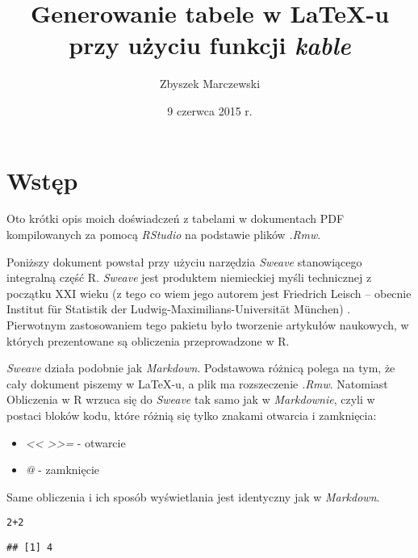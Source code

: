 \documentclass[a4paper, 10pt]{article}\usepackage[]{graphicx}\usepackage[]{color}
\makeatletter
\newcommand{\hlnum}[1]{\textcolor[rgb]{0.686,0.059,0.569}{#1}}%
\newcommand{\hlopt}[1]{\textcolor[rgb]{0,0,0}{#1}}%
\newenvironment{kframe}{%
 \def\at@end@of@kframe{}%
 \ifinner\ifhmode%
  \def\at@end@of@kframe{\end{minipage}}%
  \begin{minipage}{\columnwidth}%
 \fi\fi%
 \def\FrameCommand##1{\hskip\@totalleftmargin \hskip-\fboxsep
 \colorbox{shadecolor}{##1}\hskip-\fboxsep
     \hskip-\linewidth \hskip-\@totalleftmargin \hskip\columnwidth}%
 \MakeFramed {\advance\hsize-\width
   \@totalleftmargin\z@ \linewidth\hsize
   \@setminipage}}%
 {\par\unskip\endMakeFramed%
 \at@end@of@kframe}
\newenvironment{knitrout}{}{} %
\makeatother
\begin{document}
\title{Generowanie tabele w LaTeX-u przy użyciu funkcji \emph{kable}}
\date{9 czerwca 2015 r.}
\author{ Zbyszek Marczewski}

\maketitle

\tableofcontents

\section{Wstęp}

Oto krótki opis moich doświadczeń z tabelami w dokumentach PDF kompilowanych za pomocą \emph{RStudio} na podstawie plików \emph{.Rmw}.
\vspace{5mm}

Poniższy dokument powstał przy użyciu narzędzia \emph{Sweave} stanowiącego integralną część R. \emph{Sweave} jest produktem niemieckiej myśli technicznej z początku XXI wieku (z tego co wiem jego autorem jest Friedrich Leisch – obecnie Institut für Statistik der Ludwig-Maximilians-Universität München) . Pierwotnym zastosowaniem tego pakietu było tworzenie artykułów naukowych, w których prezentowane są obliczenia przeprowadzone w R. 
\vspace{5mm}

\emph{Sweave} działa podobnie jak \emph{Markdown}. Podstawowa różnicą polega na tym, że cały dokument  piszemy w LaTeX-u, a plik ma rozszeczenie \emph{.Rmw}. Natomiast Obliczenia w R wrzuca się do \emph{Sweave} tak samo jak w \emph{Markdownie}, czyli w postaci bloków kodu, które różnią się tylko znakami otwarcia i zamknięcia:

\begin{itemize}
  \item \emph{<< >>=} - otwarcie
  \item \emph{@} - zamknięcie
\end{itemize}

Same obliczenia i ich sposób wyświetlania jest identyczny jak w \emph{Markdown}.

\begin{knitrout}
\color{fgcolor}\begin{kframe}
\begin{alltt}
\hlnum{2}\hlopt{+}\hlnum{2}
\end{alltt}
\begin{verbatim}
## [1] 4
\end{verbatim}
\end{kframe}
\end{knitrout}
\end{document}

